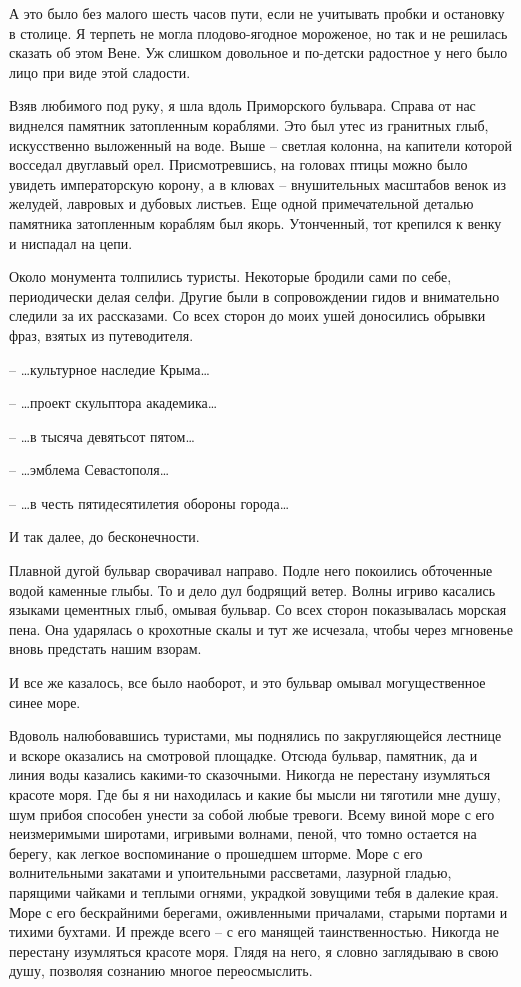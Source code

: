 \documentclass[
]{book}
\begin{document}
А это было без малого шесть часов пути, если не учитывать пробки и остановку в столице. Я терпеть не могла плодово-ягодное мороженое, но так и не решилась сказать об этом Вене. Уж слишком довольное и по-детски радостное у него было лицо при виде этой сладости.

Взяв любимого под руку, я шла вдоль Приморского бульвара. Справа от нас виднелся памятник затопленным кораблями. Это был утес из гранитных глыб, искусственно выложенный на воде. Выше -- светлая колонна, на капители которой восседал двуглавый орел. Присмотревшись, на головах птицы можно было увидеть императорскую корону, а в клювах -- внушительных масштабов венок из желудей, лавровых и дубовых листьев. Еще одной примечательной деталью памятника затопленным кораблям был якорь. Утонченный, тот крепился к венку и ниспадал на цепи.

Около монумента толпились туристы. Некоторые бродили сами по себе, периодически делая селфи. Другие были в сопровождении гидов и внимательно следили за их рассказами. Со всех сторон до моих ушей доносились обрывки фраз, взятых из путеводителя.

-- \ldots культурное наследие Крыма\ldots{}

-- \ldots проект скульптора академика\ldots{}

-- \ldots в тысяча девятьсот пятом\ldots{}

-- \ldots эмблема Севастополя\ldots{}

-- \ldots в честь пятидесятилетия обороны города\ldots{}

И так далее, до бесконечности.

Плавной дугой бульвар сворачивал направо. Подле него покоились обточенные водой каменные глыбы. То и дело дул бодрящий ветер. Волны игриво касались языками цементных глыб, омывая бульвар. Со всех сторон показывалась морская пена. Она ударялась о крохотные скалы и тут же исчезала, чтобы через мгновенье вновь предстать нашим взорам.

И все же казалось, все было наоборот, и это бульвар омывал могущественное синее море.

Вдоволь налюбовавшись туристами, мы поднялись по закругляющейся лестнице и вскоре оказались на смотровой площадке. Отсюда бульвар, памятник, да и линия воды казались какими-то сказочными. Никогда не перестану изумляться красоте моря. Где бы я ни находилась и какие бы мысли ни тяготили мне душу, шум прибоя способен унести за собой любые тревоги. Всему виной море с его неизмеримыми широтами, игривыми волнами, пеной, что томно остается на берегу, как легкое воспоминание о прошедшем шторме. Море с его волнительными закатами и упоительными рассветами, лазурной гладью, парящими чайками и теплыми огнями, украдкой зовущими тебя в далекие края. Море с его бескрайними берегами, оживленными причалами, старыми портами и тихими бухтами. И прежде всего -- с его манящей таинственностью. Никогда не перестану изумляться красоте моря. Глядя на него, я словно заглядываю в свою душу, позволяя сознанию многое переосмыслить.
\end{document}
